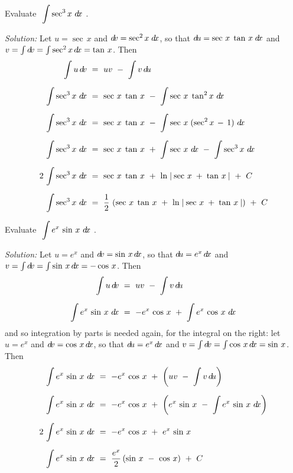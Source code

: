 \begin{exmp}\label{exmp:intparts7}
\noindent Evaluate $~\displaystyle\int \sec^3 x~d\!x~$.\vspace{1mm}
\par\noindent\emph{Solution:} Let $u=\sec\,x$ and $d\!v=\sec^2 x\;d\!x$, so that
$d\!u = \sec\,x\;\tan\,x\;d\!x$ and
$v = \int d\!v = \int \sec^2 x\,d\!x = \tan\,x$. Then
\begin{align*}
\int u\,\dv ~&=~ uv ~-~ \int v\,\du\\[6pt]
\int \sec^3 x~\dx ~&=~ \sec\,x\;\tan\,x ~-~ \int \sec\,x\;\tan^2 x~\dx\\[6pt]
\int \sec^3 x~\dx ~&=~ \sec\,x\;\tan\,x ~-~ \int \sec\,x\;(\sec^2 x \,-\, 1)~\dx\\[6pt]
\int \sec^3 x~\dx ~&=~ \sec\,x\;\tan\,x ~+~ \int \sec\,x~\dx ~-~ \int \sec^3 x~\dx\\[6pt]
2\,\int \sec^3 x~\dx ~&=~ \sec\,x\;\tan\,x ~+~
 \ln\;\abs{\,\sec\,x \;+\; \tan\,x\,} ~+~ C\\[6pt]
\int \sec^3 x~\dx ~&=~ \frac{1}{2}\,\left(\sec\,x\;\tan\,x ~+~
 \ln\;\abs{\,\sec\,x \;+\; \tan\,x\,}\right) ~+~ C
\end{align*}
\end{exmp}
\begin{exmp}\label{exmp:intparts8}
\noindent Evaluate $~\displaystyle\int e^x\,\sin\,x~d\!x~$.\vspace{1mm}
\par\noindent\emph{Solution:} Let $u=e^x$ and $d\!v=\sin\,x\,d\!x$, so
that $d\!u = e^x\,d\!x$ and $v = \int d\!v = \int \sin\,x\,d\!x = -\cos\,x$. Then
\begin{align*}
\int u\,d\!v ~&=~ uv ~-~ \int v\,d\!u\\[6pt]
\int e^x\,\sin\,x~d\!x ~&=~ -e^x\,\cos\,x ~+~ \int e^x\,\cos\,x~d\!x
\end{align*}
and so integration by parts is needed again, for the integral on the right: let
$u=e^x$ and $d\!v=\cos\,x\,d\!x$, so that $d\!u = e^x\,d\!x$ and
$v = \int d\!v = \int \cos\,x\,d\!x = \sin\,x$. Then
\begin{align*}
\int e^x\,\sin\,x~d\!x ~&=~ -e^x\,\cos\,x ~+~ \left(uv ~-~ \int v\,d\!u\right)\\[6pt]
\int e^x\,\sin\,x~d\!x ~&=~ -e^x\,\cos\,x ~+~ \left(e^x\,\sin\,x ~-~ \int e^x\,\sin\,x~d\!x\right)\\[6pt]
2\,\int e^x\,\sin\,x~d\!x ~&=~ -e^x\,\cos\,x ~+~ e^x\,\sin\,x\\[6pt]
\int e^x\,\sin\,x~d\!x ~&=~ \frac{e^x}{2}\,(\sin\,x ~-~ \cos\,x) ~+~ C
\end{align*}
\end{exmp}
